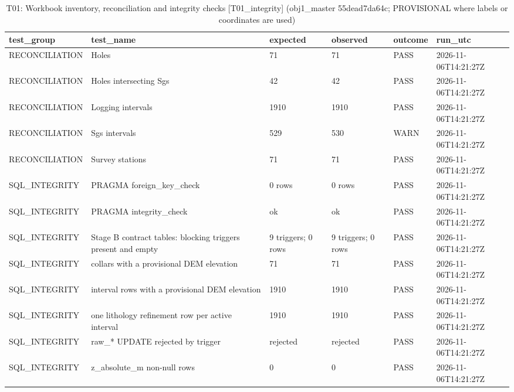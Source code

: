 \begin{table}[htbp]
\centering
\caption{T01: Workbook inventory, reconciliation and integrity checks [T01\_integrity] (obj1\_master 55dead7da64c; PROVISIONAL where labels or coordinates are used)}
\begin{tabular}{llllll}
\toprule
test\_group & test\_name & expected & observed & outcome & run\_utc \\
\midrule
RECONCILIATION & Holes & 71 & 71 & PASS & 2026-11-06T14:21:27Z \\
RECONCILIATION & Holes intersecting Sgs & 42 & 42 & PASS & 2026-11-06T14:21:27Z \\
RECONCILIATION & Logging intervals & 1910 & 1910 & PASS & 2026-11-06T14:21:27Z \\
RECONCILIATION & Sgs intervals & 529 & 530 & WARN & 2026-11-06T14:21:27Z \\
RECONCILIATION & Survey stations & 71 & 71 & PASS & 2026-11-06T14:21:27Z \\
SQL\_INTEGRITY & PRAGMA foreign\_key\_check & 0 rows & 0 rows & PASS & 2026-11-06T14:21:27Z \\
SQL\_INTEGRITY & PRAGMA integrity\_check & ok & ok & PASS & 2026-11-06T14:21:27Z \\
SQL\_INTEGRITY & Stage B contract tables: blocking triggers present and empty & 9 triggers; 0 rows & 9 triggers; 0 rows & PASS & 2026-11-06T14:21:27Z \\
SQL\_INTEGRITY & collars with a provisional DEM elevation & 71 & 71 & PASS & 2026-11-06T14:21:27Z \\
SQL\_INTEGRITY & interval rows with a provisional DEM elevation & 1910 & 1910 & PASS & 2026-11-06T14:21:27Z \\
SQL\_INTEGRITY & one lithology refinement row per active interval & 1910 & 1910 & PASS & 2026-11-06T14:21:27Z \\
SQL\_INTEGRITY & raw\_* UPDATE rejected by trigger & rejected & rejected & PASS & 2026-11-06T14:21:27Z \\
SQL\_INTEGRITY & z\_absolute\_m non-null rows & 0 & 0 & PASS & 2026-11-06T14:21:27Z \\
\bottomrule
\end{tabular}
\end{table}

